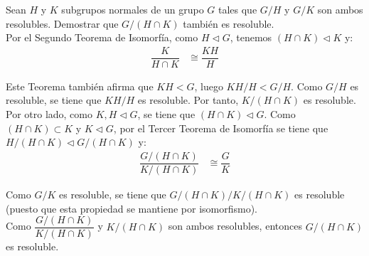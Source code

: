 \begin{ejercicio}
    Sean $H$ y $K$ subgrupos normales de un grupo $G$ tales que $G/H$ y $G/K$ son ambos resolubles. Demostrar que $G/(H \cap K)$ también es resoluble.\\


    Por el Segundo Teorema de Isomorfía, como $H\lhd G$, tenemos $(H\cap K)\lhd K$ y:
    \begin{align*}
        \dfrac{K}{H\cap K} &\cong \dfrac{KH}{H}
    \end{align*}

    Este Teorema también afirma que $KH<G$, luego $KH/H<G/H$. Como $G/H$ es resoluble, se tiene que $KH/H$ es resoluble. Por tanto, $K/(H\cap K)$ es resoluble.\\

    Por otro lado, como $K,H\lhd G$, se tiene que $(H\cap K)\lhd G$. Como $(H\cap K)\subset K$ y $K\lhd G$, por el Tercer Teorema de Isomorfía se tiene que $H/(H\cap K)\lhd G/(H\cap K)$ y:
    \begin{align*}
        \dfrac{G/(H\cap K)}{K/(H\cap K)} &\cong \dfrac{G}{K}
    \end{align*}

    Como $G/K$ es resoluble, se tiene que $G/(H\cap K)/K/(H\cap K)$ es resoluble (puesto que esta propiedad se mantiene por isomorfismo).\\

    Como $\dfrac{G/(H\cap K)}{K/(H\cap K)}$ y $K/(H\cap K)$ son ambos resolubles, entonces $G/(H\cap K)$ es resoluble.
\end{ejercicio}


